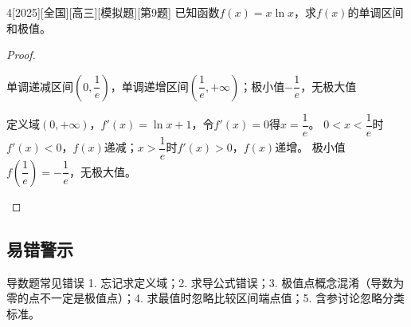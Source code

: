 \documentclass[
noshowanswers,        %
answercolor=red,    %
paper=a4,           %
sectioncolor=cyan,  %
subsectioncolor=cyan,
exercisecolor=orange, %
examplecolor=cyan,    %
bianshicolor=purple  %
]{biscuits}
\begin{document}
\begin{example}{4}[2025][全国][高三][模拟题][第9题]
	已知函数$f(x)=x\ln x$，求$f(x)$的单调区间和极值。
	\begin{proof}
		\begin{answer}
			单调递减区间$\left(0,\dfrac{1}{e}\right)$，单调递增区间$\left(\dfrac{1}{e},+\infty\right)$；极小值$-\dfrac{1}{e}$，无极大值
		\end{answer}
		\begin{solutions}
			定义域$(0,+\infty)$，$f'(x)=\ln x+1$，令$f'(x)=0$得$x=\dfrac{1}{e}$。
			$0<x<\dfrac{1}{e}$时$f'(x)<0$，$f(x)$递减；$x>\dfrac{1}{e}$时$f'(x)>0$，$f(x)$递增。
			极小值$f\left(\dfrac{1}{e}\right)=-\dfrac{1}{e}$，无极大值。
		\end{solutions}
	\end{proof}
\end{example}
	
	\subsection{易错警示}
	\begin{knowledge}{导数题常见错误}
		1. 忘记求定义域；2. 求导公式错误；3. 极值点概念混淆（导数为零的点不一定是极值点）；4. 求最值时忽略比较区间端点值；5. 含参讨论忽略分类标准。
	\end{knowledge}
	
\end{document}
